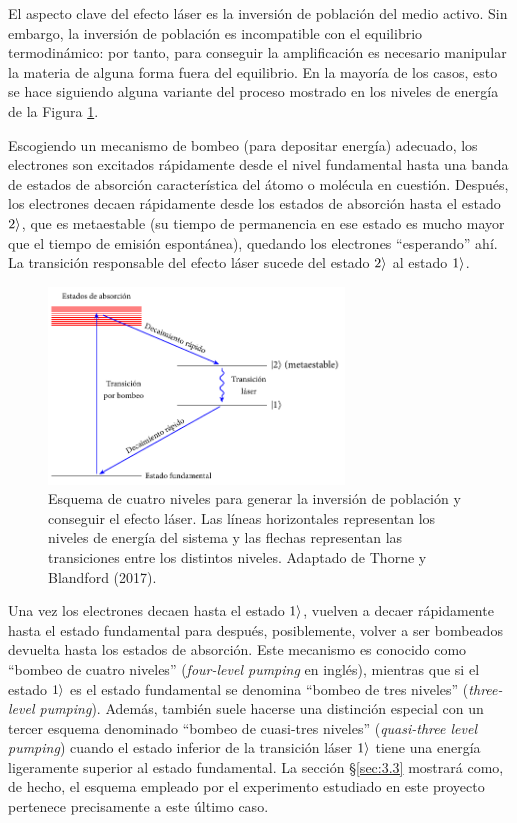 El aspecto clave del efecto láser es la inversión de población del medio activo. Sin embargo, la inversión de población es incompatible con el equilibrio termodinámico: por tanto, para conseguir la amplificación es necesario manipular la materia de alguna forma fuera del equilibrio. En la mayoría de los casos, esto se hace siguiendo alguna variante del proceso mostrado en los niveles de energía de la Figura \ref{fig:1.3}. 

Escogiendo un mecanismo de bombeo (para depositar energía) adecuado, los electrones son excitados rápidamente desde el nivel fundamental hasta una banda de estados de absorción característica del átomo o molécula en cuestión. Después, los electrones decaen rápidamente desde los estados de absorción hasta el estado $2\rangle$, que es metaestable (su tiempo de permanencia en ese estado es mucho mayor que el tiempo de emisión espontánea), quedando los electrones \enquote{esperando} ahí. La transición responsable del efecto láser sucede del estado $2\rangle$ al estado $1\rangle$. 

\begin{figure}[htbp]
  \centering
  \includegraphics[width=0.7\textwidth]{Figuras/ch1_4_level_sch.pdf}
  \caption{Esquema de cuatro niveles para generar la inversión de población y conseguir el efecto láser. Las líneas horizontales representan los niveles de energía del sistema y las flechas representan las transiciones entre los distintos niveles. Adaptado de Thorne y Blandford (2017)\autocite{Thorne2017}.}
  \label{fig:1.3}
\end{figure}

Una vez los electrones decaen hasta el estado $1\rangle$, vuelven a decaer rápidamente hasta el estado fundamental para después, posiblemente, volver a ser bombeados devuelta hasta los estados de absorción. Este mecanismo es conocido como \enquote{bombeo de cuatro niveles} (\emph{four-level pumping} en inglés), mientras que si el estado $1\rangle$ es el estado fundamental se denomina \enquote{bombeo de tres niveles} (\emph{three-level pumping}). Además, también suele hacerse una distinción especial con un tercer esquema denominado \enquote{bombeo de cuasi-tres niveles} (\emph{quasi-three level pumping}) cuando el estado inferior de la transición láser $1\rangle$ tiene una energía ligeramente superior al estado fundamental. La sección \S\ref{sec:3.3} mostrará como, de hecho, el esquema empleado por el experimento estudiado en este proyecto pertenece precisamente a este último caso.

